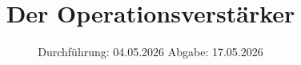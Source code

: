 

\subject{v51}
\title{Der Operationsverstärker}
\date{%
  Durchführung: 04.05.2026
  \hspace{3em}
  Abgabe: 17.05.2026
}



\maketitle
\thispagestyle{empty}
\tableofcontents
\newpage






\printbibliography{}


